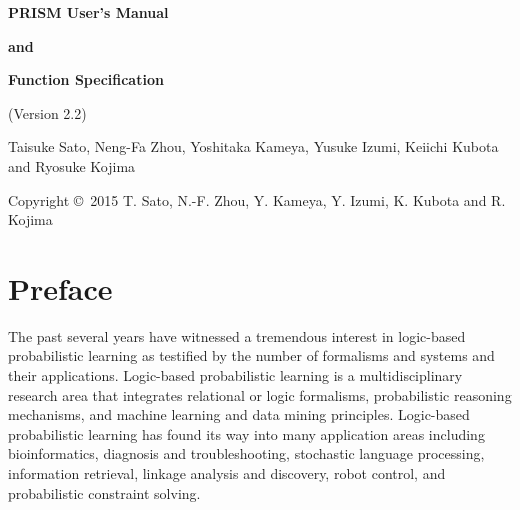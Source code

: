 \documentclass[a4paper]{report}
\begin{document}
\begin{center}
\par\vspace*{3cm}\par
{\Huge\bf PRISM User's Manual}\par\vspace*{0.5cm}\par
{\Huge\bf and}\par\vspace*{0.5cm}\par
{\Huge\bf Function Specification}\par\vspace*{0.5cm}\par
{\Large (Version 2.2)}\par\vspace*{12cm}\par

{\normalsize Taisuke Sato, Neng-Fa Zhou, Yoshitaka Kameya, Yusuke Izumi, Keiichi Kubota and Ryosuke Kojima}


\par\vspace*{2cm}\par

{\footnotesize Copyright \copyright~2015 T. Sato, N.-F. Zhou, Y. Kameya, Y. Izumi, K. Kubota and R. Kojima}
\end{center}
\thispagestyle{empty}
\setcounter{page}{0}%
\clearpage


\section*{Preface}

The past several years have witnessed a tremendous interest in logic-based
probabilistic learning as testified by the number of formalisms and systems
and their applications. Logic-based probabilistic learning is a multidisciplinary
research area that integrates relational or logic formalisms, probabilistic
reasoning mechanisms, and machine learning and data mining principles.
Logic-based probabilistic learning has found its way into many application
areas including bioinformatics, diagnosis and troubleshooting, stochastic
language processing, information retrieval, linkage analysis and discovery,
robot control, and probabilistic constraint solving.
\end{document}
